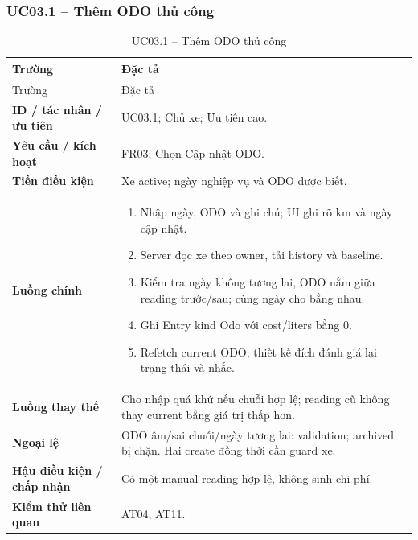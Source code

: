 \subsubsection{UC03.1 -- Thêm ODO thủ công}\label{uc:UC03.1}
\begin{smalltable}\begin{longtable}{L{3.2cm}L{11.8cm}}
\caption{UC03.1 -- Thêm ODO thủ công}\label{tab:UC03.1}\\
\toprule Trường & Đặc tả\\\midrule\endfirsthead
\toprule Trường & Đặc tả\\\midrule\endhead
\textbf{ID / tác nhân / ưu tiên} & UC03.1; Chủ xe; Ưu tiên cao.\\
\textbf{Yêu cầu / kích hoạt} & FR03; Chọn Cập nhật ODO.\\
\textbf{Tiền điều kiện} & Xe active; ngày nghiệp vụ và ODO được biết.\\
\textbf{Luồng chính} & \begin{enumerate}[leftmargin=*,nosep]
\item Nhập ngày, ODO và ghi chú; UI ghi rõ km và ngày cập nhật.
\item Server đọc xe theo owner, tải history và baseline.
\item Kiểm tra ngày không tương lai, ODO nằm giữa reading trước/sau; cùng ngày cho bằng nhau.
\item Ghi Entry kind Odo với cost/liters bằng 0.
\item Refetch current ODO; thiết kế đích đánh giá lại trạng thái và nhắc.
\end{enumerate}\\
\textbf{Luồng thay thế} & Cho nhập quá khứ nếu chuỗi hợp lệ; reading cũ không thay current bằng giá trị thấp hơn.\\
\textbf{Ngoại lệ} & ODO âm/sai chuỗi/ngày tương lai: validation; archived bị chặn. Hai create đồng thời cần guard xe.\\
\textbf{Hậu điều kiện / chấp nhận} & Có một manual reading hợp lệ, không sinh chi phí.\\
\textbf{Kiểm thử liên quan} & AT04, AT11.\\
\bottomrule\end{longtable}\end{smalltable}
